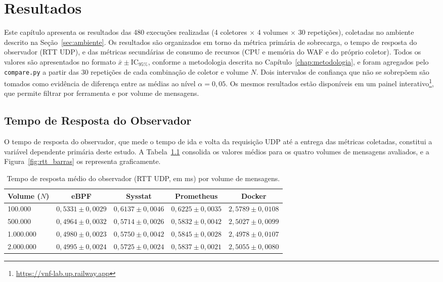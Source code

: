 \chapter{Resultados}
\label{chap:resultados}

Este capítulo apresenta os resultados das 480 execuções realizadas (4 coletores $\times$ 4 volumes $\times$ 30 repetições), coletadas no ambiente descrito na Seção~\ref{sec:ambiente}. Os resultados são organizados em torno da métrica primária de sobrecarga, o tempo de resposta do observador (RTT UDP), e das métricas secundárias de consumo de recursos (CPU e memória do WAF e do próprio coletor). Todos os valores são apresentados no formato $\bar{x} \pm \text{IC}_{95\%}$, conforme a metodologia descrita no Capítulo~\ref{chap:metodologia}, e foram agregados pelo \texttt{compare.py} a partir das 30 repetições de cada combinação de coletor e volume $N$. Dois intervalos de confiança que não se sobrepõem são tomados como evidência de diferença entre as médias ao nível $\alpha = 0{,}05$. Os mesmos resultados estão disponíveis em um painel interativo\footnote{\url{https://vnf-lab.up.railway.app}}, que permite filtrar por ferramenta e por volume de mensagens.

\section{Tempo de Resposta do Observador}
\label{sec:resultados_rtt}

O tempo de resposta do observador, que mede o tempo de ida e volta da requisição UDP até a entrega das métricas coletadas, constitui a variável dependente primária deste estudo. A Tabela~\ref{tab:rtt} consolida os valores médios para os quatro volumes de mensagens avaliados, e a Figura~\ref{fig:rtt_barras} os representa graficamente.

\begin{table}[htbp]
\centering
\caption{Tempo de resposta médio do observador (RTT UDP, em ms) por volume de mensagens.}
\label{tab:rtt}
\begin{tabular}{lcccc}
\hline
\textbf{Volume ($N$)} & \textbf{eBPF} & \textbf{Sysstat} & \textbf{Prometheus} & \textbf{Docker} \\
\hline
100.000   & $0{,}5331 \pm 0{,}0029$ & $0{,}6137 \pm 0{,}0046$ & $0{,}6225 \pm 0{,}0035$ & $2{,}5789 \pm 0{,}0108$ \\
500.000   & $0{,}4964 \pm 0{,}0032$ & $0{,}5714 \pm 0{,}0026$ & $0{,}5832 \pm 0{,}0042$ & $2{,}5027 \pm 0{,}0099$ \\
1.000.000 & $0{,}4980 \pm 0{,}0023$ & $0{,}5750 \pm 0{,}0042$ & $0{,}5845 \pm 0{,}0028$ & $2{,}4978 \pm 0{,}0107$ \\
2.000.000 & $0{,}4995 \pm 0{,}0024$ & $0{,}5725 \pm 0{,}0024$ & $0{,}5837 \pm 0{,}0021$ & $2{,}5055 \pm 0{,}0080$ \\
\hline
\end{tabular}
\end{table}

